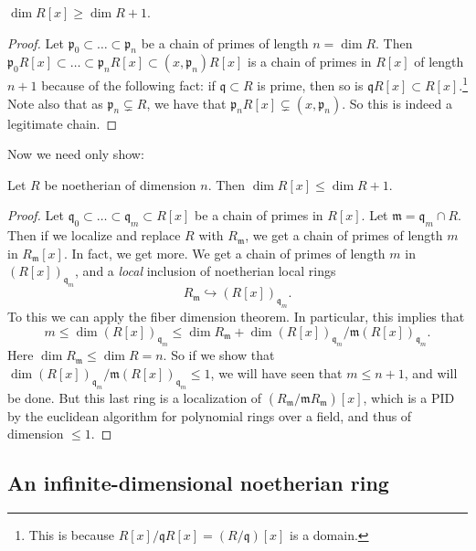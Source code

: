 \begin{lemma} 
$\dim R[x] \geq \dim R+1$.
\end{lemma} 
\begin{proof} 
Let $\mathfrak{p}_0 \subset \dots \subset \mathfrak{p}_n$ be a chain of primes of
length $n = \dim R$. Then $\mathfrak{p}_0 R[x] \subset \dots \subset
\mathfrak{p}_n R[x] \subset (x, \mathfrak{p}_n)R[x]$ is a chain of primes in
$R[x]$ of length $n+1$ because of the following fact: if $\mathfrak{q} \subset
R$ is prime, then so is $\mathfrak{q}R[x] \subset R[x]$.\footnote{This is
because $R[x]/\mathfrak{q}R[x] = (R/\mathfrak{q})[x]$ is a domain.} Note also
that as $\mathfrak{p}_n \subsetneq R$, we have that $\mathfrak{p}_n R[x]
\subsetneq (x, \mathfrak{p}_n)$. So this is indeed a legitimate chain. 
\end{proof} 

Now we need only show:
\begin{lemma} 
Let $R$ be noetherian of dimension $n$. Then $\dim R[x] \leq \dim R+1$.
\end{lemma} 
\begin{proof} 
Let $\mathfrak{q}_0 \subset \dots \subset \mathfrak{q}_m \subset R[x]$ be a chain of primes
in $R[x]$. Let $\mathfrak{m} = \mathfrak{q}_m \cap R$. Then if we localize and
replace $R$ with $R_{\mathfrak{m}}$, we get a chain of primes of length $m$ in
$R_{\mathfrak{m}}[x]$. 
In fact, we get more. We get a chain of primes of length $m$ in
$(R[x])_{\mathfrak{q}_m}$, and a \emph{local } inclusion of noetherian local rings
\[ R_{\mathfrak{m}} \hookrightarrow (R[x])_{\mathfrak{q}_m} . \]
To this we can apply the fiber dimension theorem. In particular, this implies
that
\[ m \leq \dim (R[x])_{\mathfrak{q}_m} \leq \dim R_{\mathfrak{m}} + \dim
(R[x])_{\mathfrak{q}_m} /\mathfrak{m} (R[x])_{\mathfrak{q}_m}. \]
Here $\dim R_{\mathfrak{m}} \leq \dim R = n$. So if we show that $\dim
(R[x])_{\mathfrak{q}_m} /\mathfrak{m} (R[x])_{\mathfrak{q}_m} \leq 1$, we will
have seen that $m \leq n+1$, and will be done. But this last ring is a
localization of $(R_{\mathfrak{m}}/\mathfrak{m}R_{\mathfrak{m}})[x]$, which is
a PID by the euclidean algorithm for polynomial rings over a field, and thus of
dimension  $\leq 1$.
\end{proof} 

\subsection{An infinite-dimensional noetherian ring}

